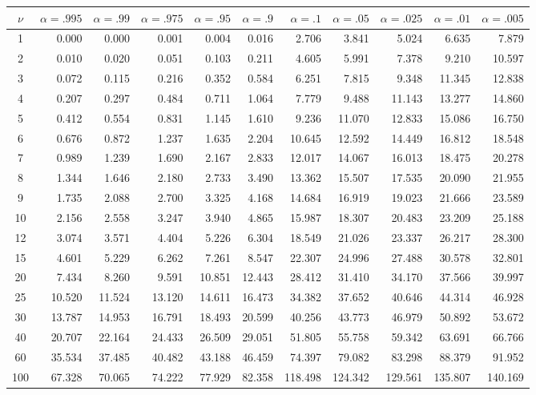 \begin{center}
\scriptsize
\setlength{\tabcolsep}{3.5pt}
\begin{tabular}{c*{10}{r}}
\toprule
$\nu$ & $\alpha=.995$ & $\alpha=.99$ & $\alpha=.975$ & $\alpha=.95$ & $\alpha=.9$ & $\alpha=.1$ & $\alpha=.05$ & $\alpha=.025$ & $\alpha=.01$ & $\alpha=.005$ \\
\midrule
1 & 0.000 & 0.000 & 0.001 & 0.004 & 0.016 & 2.706 & 3.841 & 5.024 & 6.635 & 7.879 \\
2 & 0.010 & 0.020 & 0.051 & 0.103 & 0.211 & 4.605 & 5.991 & 7.378 & 9.210 & 10.597 \\
3 & 0.072 & 0.115 & 0.216 & 0.352 & 0.584 & 6.251 & 7.815 & 9.348 & 11.345 & 12.838 \\
4 & 0.207 & 0.297 & 0.484 & 0.711 & 1.064 & 7.779 & 9.488 & 11.143 & 13.277 & 14.860 \\
5 & 0.412 & 0.554 & 0.831 & 1.145 & 1.610 & 9.236 & 11.070 & 12.833 & 15.086 & 16.750 \\
6 & 0.676 & 0.872 & 1.237 & 1.635 & 2.204 & 10.645 & 12.592 & 14.449 & 16.812 & 18.548 \\
7 & 0.989 & 1.239 & 1.690 & 2.167 & 2.833 & 12.017 & 14.067 & 16.013 & 18.475 & 20.278 \\
8 & 1.344 & 1.646 & 2.180 & 2.733 & 3.490 & 13.362 & 15.507 & 17.535 & 20.090 & 21.955 \\
9 & 1.735 & 2.088 & 2.700 & 3.325 & 4.168 & 14.684 & 16.919 & 19.023 & 21.666 & 23.589 \\
10 & 2.156 & 2.558 & 3.247 & 3.940 & 4.865 & 15.987 & 18.307 & 20.483 & 23.209 & 25.188 \\
12 & 3.074 & 3.571 & 4.404 & 5.226 & 6.304 & 18.549 & 21.026 & 23.337 & 26.217 & 28.300 \\
15 & 4.601 & 5.229 & 6.262 & 7.261 & 8.547 & 22.307 & 24.996 & 27.488 & 30.578 & 32.801 \\
20 & 7.434 & 8.260 & 9.591 & 10.851 & 12.443 & 28.412 & 31.410 & 34.170 & 37.566 & 39.997 \\
25 & 10.520 & 11.524 & 13.120 & 14.611 & 16.473 & 34.382 & 37.652 & 40.646 & 44.314 & 46.928 \\
30 & 13.787 & 14.953 & 16.791 & 18.493 & 20.599 & 40.256 & 43.773 & 46.979 & 50.892 & 53.672 \\
40 & 20.707 & 22.164 & 24.433 & 26.509 & 29.051 & 51.805 & 55.758 & 59.342 & 63.691 & 66.766 \\
60 & 35.534 & 37.485 & 40.482 & 43.188 & 46.459 & 74.397 & 79.082 & 83.298 & 88.379 & 91.952 \\
100 & 67.328 & 70.065 & 74.222 & 77.929 & 82.358 & 118.498 & 124.342 & 129.561 & 135.807 & 140.169 \\
\bottomrule
\end{tabular}
\end{center}


